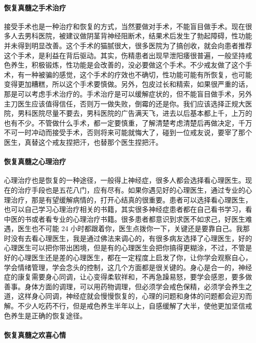 \documentclass{ctexart}
\begin{document}
\paragraph{恢复真髓之手术治疗}

接受手术也是一种治疗和恢复的方式，当然要做对手术，不能盲目做手术。现在很多人去男科医院，被建议做阴茎背神经阻断术，结果术后发生了勃起障碍，性功能并未得到明显改善。这个手术的猫腻很大，很多医院为了搞创收，就会向患者推荐这个手术，是利益在背后驱动。其实，伤精患者出现早泄阳痿很普遍，一般坚持戒色养生，积极锻炼，性功能是会改善的，没必要做这个手术。不少戒友做了这个手术，有一种被骗的感觉，这个手术的疗效也不确切，性功能可能有所恢复，也可能变得更加糟糕，所以这个手术要慎做。另外，包皮过长和精索，如果很严重的话，那是可以考虑手术治疗的。手术治疗是可以缓解症状的，但不能盲目做手术，另外主刀医生应该值得信任，否则万一做失败，倒霉的还是你。我们应该选择正规大医院，男科医院尽量不要去，男科医院的广告满天飞，进去以后基本都上千，上万的也有不少。不管做什么手术，都一定要慎重，了解清楚考虑清楚后再做决定，千万不可一时冲动而接受手术，否则将来可能就悔大了，碰到一位戒友说，要宰了那个医生，真替这个戒友捏把汗，也替那个医生捏把汗。

\paragraph{恢复真髓之心理治疗}

心理治疗也是恢复的一种途径，一般得上神经症，很多人都会选择看心理医生。现在的治疗手段也是五花八门，应有尽有。如果你遇见好的心理医生，通过专业的心理治疗，那是有望缓解病情的，打开心结真的很重要。患者可以选择看心理医生，也可以自己学习心理治疗相关的书籍，其实很多神经症患者都在自己看书学习，看中医的书或者看专业的心理治疗书籍。很多患者都意识到求医不如求己，好医生难遇，医生也不可能 24 小时都跟着你，医生点拨你一下，关键还是要靠自己。我那时没有去看心理医生，我是通过佛法来调心的，有很多病友选择了心理医生，好的心理医生可以把你带出困境，但是有的心理医生会把你搞得更糊涂，不过，不管是好的心理医生还是差的心理医生，都在一定程度上启发了你，让你学会观察自心，学会情绪管理，学会念头的控制，这几个方面都是很关键的。身心是合一的，神经症的康复需要身心同调，让心变得柔软祥和，不再急躁易怒，要学会感恩，要多做善事。身体方面的调理，可以用药物调理，但必须学会戒色保精，必须学会养生之道，这样身心同调，神经症就会慢慢恢复的，心理的问题和身体的问题都会迎刃而解。不少人吃药不行，但是戒色养生半年以上，自感缓解了大半，使他更加坚信戒色养生是正确的恢复途径。

\paragraph{恢复真髓之欢喜心情}
\end{document}
